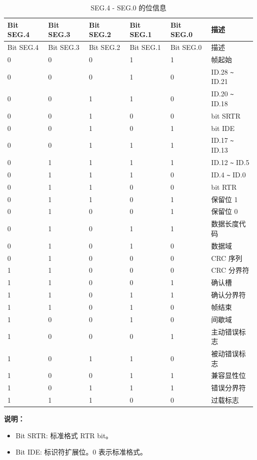 \documentclass[main\_\_CN.tex]{subfiles}
\begin{document}
\begin{longtable}[c]{|p{2cm}<{\centering}|p{2cm}<{\centering}|p{2cm}<{\centering}|p{2cm}<{\centering}|p{2cm}<{\centering}|p{4cm}|}
    \caption{SEG.4 - SEG.0 的位信息}
    \label{table:Bit_information}\\
    \hline
    \rowcolor{lightgray}
   Bit SEG.4 & Bit SEG.3 & Bit SEG.2 & Bit SEG.1 & Bit SEG.0 & 描述
   \\\hline
   \endfirsthead

   \hline
   \rowcolor{lightgray}
   Bit SEG.4 & Bit SEG.3 & Bit SEG.2 & Bit SEG.1 & Bit SEG.0 & 描述
   \\\hline
   \endhead
   \endfoot
   \hline
   \endlastfoot

    0 & 0 & 0 & 1 & 1 & 帧起始
    \\\hline
    0 & 0 & 0 & 1 & 0 & ID.28 \verb+~+ ID.21
    \\\hline
    0 & 0 & 1 & 1 & 0 & ID.20 \verb+~+ ID.18
    \\\hline
    0 & 0 & 1 & 0 & 0 & bit SRTR
    \\\hline
    0 & 0 & 1 & 0 & 1 & bit IDE
    \\\hline
    0 & 0 & 1 & 1 & 1 & ID.17 \verb+~+ ID.13
    \\\hline
    0 & 1 & 1 & 1 & 1 & ID.12 \verb+~+ ID.5
    \\\hline
    0 & 1 & 1 & 1 & 0 & ID.4 \verb+~+ ID.0
    \\\hline
    0 & 1 & 1 & 0 & 0 & bit RTR
    \\\hline
    0 & 1 & 1 & 0 & 1 & 保留位 1
    \\\hline
    0 & 1 & 0 & 0 & 1 & 保留位 0
    \\\hline
    0 & 1 & 0 & 1 & 1 & 数据长度代码
    \\\hline
    0 & 1 & 0 & 1 & 0 & 数据域
    \\\hline
    0 & 1 & 0 & 0 & 0 & CRC 序列
    \\\hline
    1 & 1 & 0 & 0 & 0 & CRC 分界符
    \\\hline
    1 & 1 & 0 & 0 & 1 & 确认槽
    \\\hline
    1 & 1 & 0 & 1 & 1 & 确认分界符
    \\\hline
    1 & 1 & 0 & 1 & 0 & 帧结束
    \\\hline
    1 & 0 & 0 & 1 & 0 & 间歇域
    \\\hline
    1 & 0 & 0 & 0 & 1 & 主动错误标志
    \\\hline
    1 & 0 & 1 & 1 & 0 & 被动错误标志
    \\\hline
    1 & 0 & 0 & 1 & 1 & 兼容显性位
    \\\hline
    1 & 0 & 1 & 1 & 1 & 错误分界符
    \\\hline
    1 & 1 & 1 & 0 & 0 & 过载标志
    \\\hline
\end{longtable}
\vspace{-1.5em}
{\bfseries 说明：}\\
\begin{itemize}
    \item Bit SRTR: 标准格式 RTR bit。
    \item Bit IDE: 标识符扩展位。0 表示标准格式。
\end{itemize}
\end{document}
